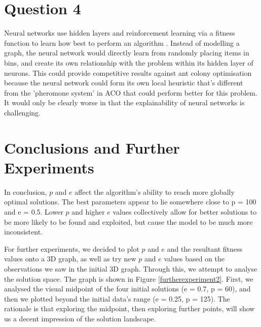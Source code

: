\documentclass[a4paper, 11pt]{article}
\begin{document}
\section{Question 4}

Neural networks use hidden layers and reinforcement learning via a fitness function to learn how best to perform an algorithm \cite{gurney2018introduction}. Instead of modelling a graph, the neural network would directly learn from randomly placing items in bins, and create its own relationship with the problem within its hidden layer of neurons. This could provide competitive results against ant colony optimisation because the neural network could form its own local heuristic that's different from the 'pheromone system' in ACO that could perform better for this problem. It would only be clearly worse in that the explainability of neural networks is challenging.

\section{Conclusions and Further Experiments}

In conclusion, $p$ and $e$ affect the algorithm's ability to reach more globally optimal solutions. The best parameters appear to lie somewhere close to p = 100 and e = 0.5. Lower $p$ and higher $e$ values collectively allow for better solutions to be more likely to be found and exploited, but cause the model to be much more inconsistent.

For further experiments, we decided to plot $p$ and $e$ and the resultant fitness values onto a 3D graph, as well as try new $p$ and $e$ values based on the observations we saw in the initial 3D graph. Through this, we attempt to analyse the solution space. The graph is shown in Figure \ref{furtherexperiment2}. First, we analysed the visual midpoint of the four initial solutions (e = 0.7, p = 60), and then we plotted beyond the initial data's range (e = 0.25, p = 125). The rationale is that exploring the midpoint, then exploring further points, will show us a decent impression of the solution landscape.
\end{document}
